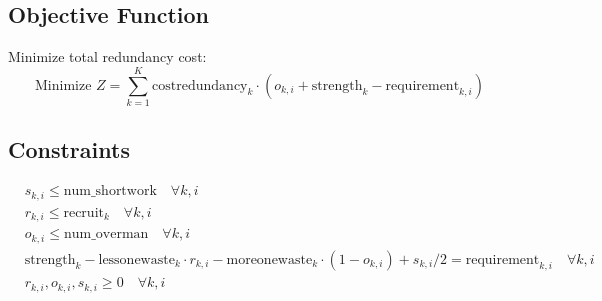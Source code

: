 \documentclass{article}
\begin{document}
\subsection*{Objective Function}
Minimize total redundancy cost:
\[
\text{Minimize } Z = \sum_{k=1}^{K} \text{costredundancy}_{k} \cdot (o_{k,i} + \text{strength}_{k} - \text{requirement}_{k,i}) 
\]

\subsection*{Constraints}
\begin{align}
    & s_{k,i} \leq \text{num\_shortwork} \quad \forall k, i \\
    & r_{k,i} \leq \text{recruit}_{k} \quad \forall k, i \\
    & o_{k,i} \leq \text{num\_overman} \quad \forall k, i \\
    & \text{strength}_{k} - \text{lessonewaste}_{k} \cdot r_{k,i} - \text{moreonewaste}_{k} \cdot (1 - o_{k,i}) + s_{k,i}/2 = \text{requirement}_{k,i} \quad \forall k, i \\
    & r_{k,i}, o_{k,i}, s_{k,i} \geq 0 \quad \forall k, i
\end{align}
\end{document}
